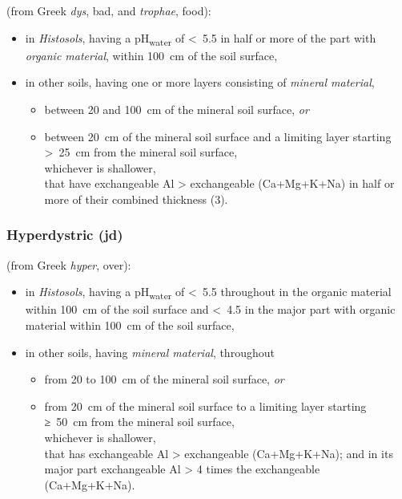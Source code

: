 \documentclass[
  letterpaper,
  DIV=11,
  numbers=noendperiod]{scrreprt}
\providecommand{\tightlist}{%
  \setlength{\itemsep}{0pt}\setlength{\parskip}{0pt}}\usepackage{longtable,booktabs,array}
\begin{document}
(from Greek \emph{dys}, bad, and \emph{trophae}, food):

\begin{itemize}
\tightlist
\item
  in \emph{Histosols}, having a pH\textsubscript{water} of \textless~5.5
  in half or more of the part with \emph{organic material}, within
  100~cm of the soil surface,
\item
  in other soils, having one or more layers consisting of \emph{mineral
  material},

  \begin{itemize}
  \tightlist
  \item
    between 20 and 100~cm of the mineral soil surface, \emph{or}
  \item
    between 20~cm of the mineral soil surface and a limiting layer
    starting \textgreater~25~cm from the mineral soil surface,\\
    whichever is shallower,\\
    that have exchangeable Al \textgreater{} exchangeable (Ca+Mg+K+Na)
    in half or more of their combined thickness (3).
  \end{itemize}
\end{itemize}

\hypertarget{hyperdystric-jd}{%
\subsubsection{Hyperdystric (jd)}\label{hyperdystric-jd}}

(from Greek \emph{hyper}, over):

\begin{itemize}
\item
  in \emph{Histosols}, having a pH\textsubscript{water} of \textless~5.5
  throughout in the organic material within 100~cm of the soil surface
  and \textless~4.5 in the major part with organic material within
  100~cm of the soil surface,
\item
  in other soils, having \emph{mineral material}, throughout

  \begin{itemize}
  \tightlist
  \item
    from 20 to 100~cm of the mineral soil surface, \emph{or}
  \item
    from 20~cm of the mineral soil surface to a limiting layer starting
    ≥~50~cm from the mineral soil surface,\\
    whichever is shallower,\\
    that has exchangeable Al \textgreater{} exchangeable (Ca+Mg+K+Na);
    and in its major part exchangeable Al \textgreater{} 4 times the
    exchangeable (Ca+Mg+K+Na).
  \end{itemize}
\end{itemize}
\end{document}
